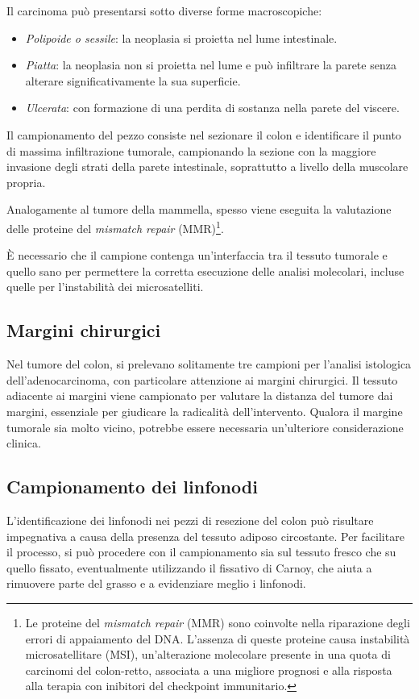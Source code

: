 Il carcinoma può presentarsi sotto diverse forme macroscopiche:
\begin{itemize}
    \item \textit{Polipoide o sessile}: la neoplasia si proietta nel lume intestinale.
    \item \textit{Piatta}: la neoplasia non si proietta nel lume e può infiltrare la parete senza alterare significativamente la sua superficie.
    \item \textit{Ulcerata}: con formazione di una perdita di sostanza nella parete del viscere.
\end{itemize}

Il campionamento del pezzo consiste nel sezionare il colon e identificare il punto di massima infiltrazione tumorale, campionando la sezione con la maggiore invasione degli strati della parete intestinale, soprattutto a livello della muscolare propria.

Analogamente al tumore della mammella, spesso viene eseguita la valutazione delle proteine del \textit{mismatch repair} (MMR)\footnote{Le proteine del \textit{mismatch repair} (MMR) sono coinvolte nella riparazione degli errori di appaiamento del DNA. L'assenza di queste proteine causa instabilità microsatellitare (MSI), un'alterazione molecolare presente in una quota di carcinomi del colon-retto, associata a una migliore prognosi e alla risposta alla terapia con inibitori del checkpoint immunitario.}. 

È necessario che il campione contenga un'interfaccia tra il tessuto tumorale e quello sano per permettere la corretta esecuzione delle analisi molecolari, incluse quelle per l'instabilità dei microsatelliti.

\subsection{Margini chirurgici}
Nel tumore del colon, si prelevano solitamente tre campioni per l'analisi istologica dell'adenocarcinoma, con particolare attenzione ai margini chirurgici. Il tessuto adiacente ai margini viene campionato per valutare la distanza del tumore dai margini, essenziale per giudicare la radicalità dell'intervento. Qualora il margine tumorale sia molto vicino, potrebbe essere necessaria un'ulteriore considerazione clinica.

\subsection{Campionamento dei linfonodi}
L'identificazione dei linfonodi nei pezzi di resezione del colon può risultare impegnativa a causa della presenza del tessuto adiposo circostante. Per facilitare il processo, si può procedere con il campionamento sia sul tessuto fresco che su quello fissato, eventualmente utilizzando il fissativo di Carnoy, che aiuta a rimuovere parte del grasso e a evidenziare meglio i linfonodi.

